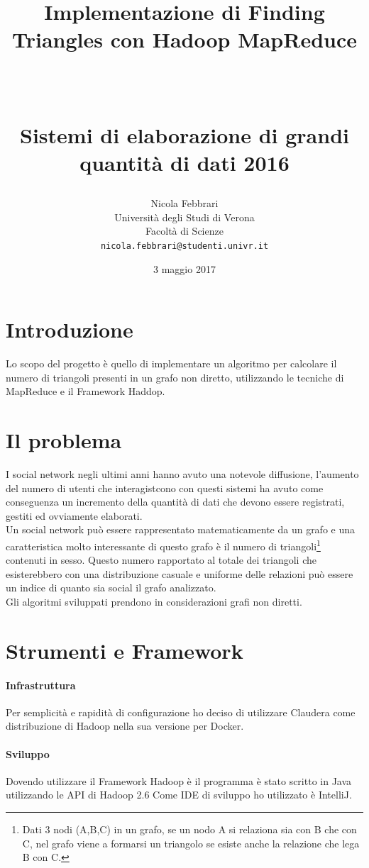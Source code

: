 \documentclass[paper=a4, fontsize=11pt]{scrartcl}	%
\title{ \vspace{-1in} 	\usefont{OT1}{bch}{b}{n}
		\huge \strut Implementazione di Finding Triangles con Hadoop MapReduce\strut \\
		\Large \bfseries \strut Sistemi di elaborazione di grandi quantità di dati 2016 \strut
}
\author{ 									\usefont{OT1}{bch}{m}{n}
        Nicola Febbrari\\		\usefont{OT1}{bch}{m}{n}
        Università degli Studi di Verona\\	\usefont{OT1}{bch}{m}{n}
        Facoltà di Scienze\\
        \texttt{nicola.febbrari@studenti.univr.it}
}
\date{3 maggio 2017}
\numberwithin{equation}{section}															%
\numberwithin{figure}{section}																%
\numberwithin{table}{section}																%
\begin{document}
\maketitle
\section{Introduzione}
Lo scopo del progetto è quello di implementare un algoritmo per calcolare il numero di triangoli presenti in un grafo non diretto, utilizzando le tecniche di MapReduce e il Framework Haddop.


\section{Il problema}
I social network negli ultimi anni hanno avuto una notevole diffusione, l'aumento del numero di utenti che interagistcono con questi sistemi ha avuto come conseguenza un  incremento della quantità di dati che devono essere registrati, gestiti ed ovviamente elaborati.\\
Un social network può essere rappresentato matematicamente da un grafo e una caratteristica molto interessante di questo grafo è il numero di triangoli\footnote{Dati 3 nodi (A,B,C) in un grafo, se un nodo A si relaziona sia con B che con C, nel grafo viene a formarsi un triangolo se esiste anche la relazione che lega B con C.} 
contenuti in sesso. Questo numero rapportato al totale dei triangoli che esisterebbero con una distribuzione casuale e uniforme delle relazioni può essere un indice di quanto sia social il grafo analizzato.\\
Gli algoritmi sviluppati prendono in considerazioni grafi non diretti.\\
\section{Strumenti e Framework}
\paragraph{Infrastruttura}
Per semplicità e rapidità di configurazione ho deciso di utilizzare Claudera come distribuzione di Hadoop nella sua versione per Docker.
\paragraph{Sviluppo}
Dovendo utilizzare il Framework Hadoop è il programma è stato scritto in Java utilizzando le API di Hadoop 2.6 Come IDE di sviluppo ho utilizzato è IntelliJ.  
\end{document}
